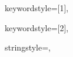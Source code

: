 {%

keywordstyle=[1]{\ttfamily\color{keywordcolor}},




keywordstyle=[2]{\ttfamily\color{sortcolor}},












stringstyle=\ttfamily,







}
